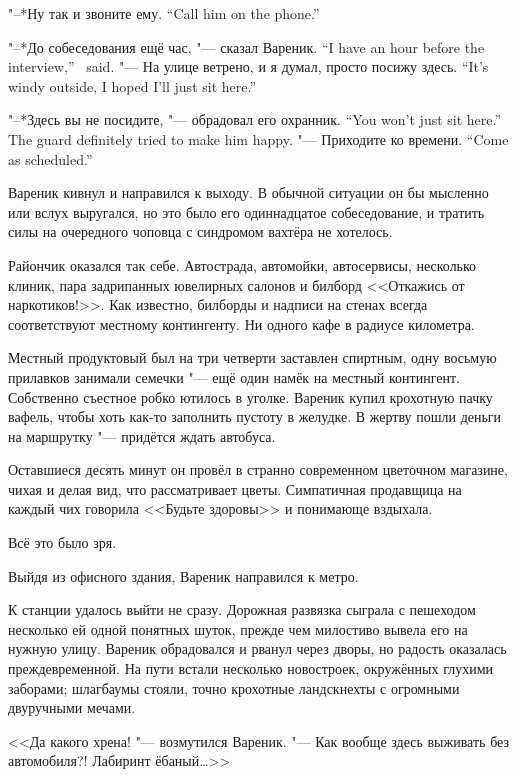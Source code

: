 {"--*Ну так и звоните ему.}
{``Call him on the phone.''}

{"--*До собеседования ещё час, "--- сказал Вареник.}
{``I have an hour before the interview,'' \Varenik\ said.}
{"--- На улице ветрено, и я думал, просто посижу здесь.}
{``It's windy outside, I hoped I'll just sit here.''}

{"--*Здесь вы не посидите, "--- обрадовал его охранник.}
{``You won't just sit here.'' The guard definitely tried to make him happy.}
{"--- Приходите ко времени.}
{``Come as scheduled.''}

Вареник кивнул и направился к выходу.
В обычной ситуации он бы мысленно или вслух выругался, но это было его одиннадцатое собеседование, и тратить силы на очередного чоповца с синдромом вахтёра не хотелось.

Райончик оказался так себе.
Автострада, автомойки, автосервисы, несколько клиник, пара задрипанных ювелирных салонов и билборд <<Откажись от наркотиков!>>.
Как известно, билборды и надписи на стенах всегда соответствуют местному контингенту.
Ни одного кафе в радиусе километра.

Местный продуктовый был на три четверти заставлен спиртным, одну восьмую прилавков занимали семечки "--- ещё один намёк на местный контингент.
Собственно съестное робко ютилось в уголке.
Вареник купил крохотную пачку вафель, чтобы хоть как-то заполнить пустоту в желудке.
В жертву пошли деньги на маршрутку "--- придётся ждать автобуса.

Оставшиеся десять минут он провёл в странно современном цветочном магазине, чихая и делая вид, что рассматривает цветы.
Симпатичная продавщица на каждый чих говорила <<Будьте здоровы>> и понимающе вздыхала.

Всё это было зря.

\asterism

Выйдя из офисного здания, Вареник направился к метро.

К станции удалось выйти не сразу.
Дорожная развязка сыграла с пешеходом несколько ей одной понятных шуток, прежде чем милостиво вывела его на нужную улицу.
Вареник обрадовался и рванул через дворы, но радость оказалась преждевременной.
На пути встали несколько новостроек, окружённых глухими заборами;
шлагбаумы стояли, точно крохотные ландскнехты с огромными двуручными мечами.

<<Да какого хрена! "--- возмутился Вареник.
"--- Как вообще здесь выживать без автомобиля?!
Лабиринт ёбаный\ldots{}>>

